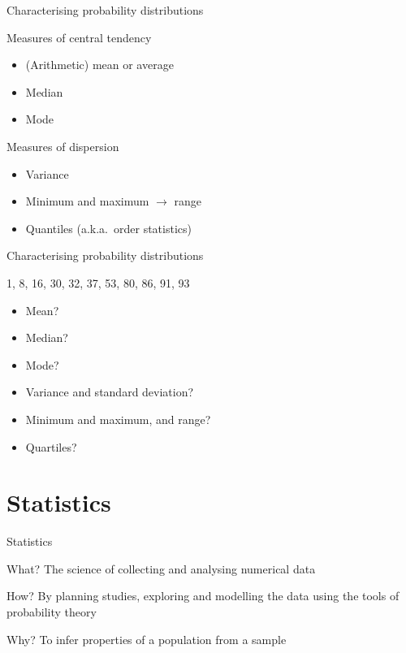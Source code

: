 \begin{frame}{Characterising probability distributions}
    \begin{block}{Measures of central tendency}
        \begin{itemize}
            \item (Arithmetic) mean or average
            \item Median
            \item Mode
        \end{itemize}
    \end{block}
    \vfill\pause
    \begin{block}{Measures of dispersion}
        \begin{itemize}
            \item Variance
            \item Minimum and maximum $\rightarrow$ range
            \item Quantiles (a.k.a.\ order statistics)
        \end{itemize}
    \end{block}
\end{frame}

\begin{frame}{Characterising probability distributions}
    \begin{center}
        \large%
        1, 8, 16, 30, 32, 37, 53, 80, 86, 91, 93
    \end{center}
    \vfill
    \begin{itemize}
        \item Mean?
        \item Median?
        \item Mode?
        \item Variance and standard deviation?
        \item Minimum and maximum, and range?
        \item Quartiles?
    \end{itemize}
\end{frame}

\section{Statistics}

\begin{frame}{Statistics}
    \begin{block}{What?}
        The science of collecting and analysing numerical data
    \end{block}
    \vfill\pause
    \begin{block}{How?}
        By planning studies, exploring and modelling the data using the tools of
        \alert{probability theory}
    \end{block}
    \vfill\pause
    \begin{block}{Why?}
        To infer properties of a \alert{population} from a \alert{sample}
    \end{block}
\end{frame}

